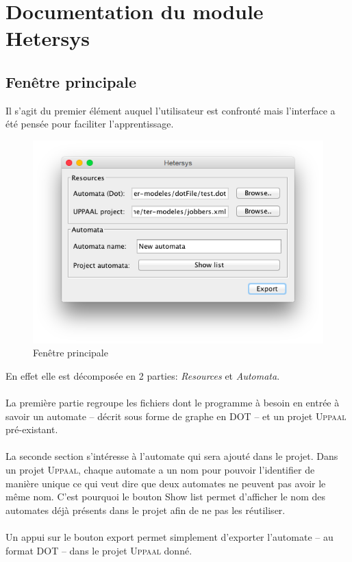 \documentclass[12pt,a4paper]{report}
\begin{document}
\section{Documentation du module Hetersys}
\subsection{Fenêtre principale}

Il s'agit du premier élément auquel l'utilisateur est confronté mais l'interface a été 
pensée pour faciliter l'apprentissage.

\begin{figure}[!h]
  \centering
  \includegraphics[scale=0.6]{ressources/gui/home.png}
  \caption{Fenêtre principale}
\end{figure}

En effet elle est décomposée en 2 parties: \emph{Resources} et \emph{Automata}. 
\\\\
La première partie regroupe les fichiers dont le programme à besoin en entrée à savoir 
un automate -- décrit sous forme de graphe en DOT -- et un projet \textsc{Uppaal} pré-existant.
\\\\
La seconde section s'intéresse à l'automate qui sera ajouté dans le projet. Dans un projet
\textsc{Uppaal}, chaque automate a un nom pour pouvoir l'identifier de manière unique ce qui veut
dire que deux automates ne peuvent pas avoir le même nom. C'est pourquoi le bouton 
\og{}Show list\fg{} permet d'afficher le nom des automates déjà présents dans le projet 
afin de ne pas les réutiliser.
\\\\
Un appui sur le bouton export permet simplement d'exporter l'automate -- au format DOT -- 
dans le projet \textsc{Uppaal} donné.
\end{document}
